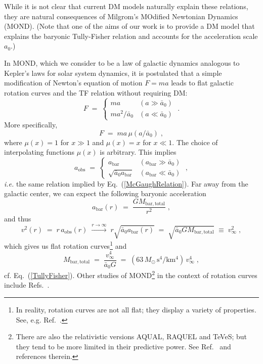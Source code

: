\documentclass{bjp}
\newcommand{\GN}{G}
\newcommand{\ac}{\bar{a}_0}
\begin{document}
While it is not clear that current DM models  naturally explain these relations, 
they are natural consequences of Milgrom's MOdified Newtonian Dynamics (MOND).\cite{Milgrom:1983ca,Milgrom:1983pn,Milgrom:1983zz} (Note that one of the aims of our work is to provide a DM model that explains the baryonic Tully-Fisher relation and accounts for the acceleration scale $a_0$.)

In MOND, which we consider to be a law of galactic dynamics analogous to Kepler's laws for solar system dynamics, it is postulated that a simple modification of Newton's equation of motion $F=ma$ leads to flat galactic rotation curves and the TF relation without requiring DM:
%
\begin{equation}
F \;=\; 
\begin{cases}
ma        & (a \gg \ac) \\
ma^2/\ac  & (a \ll \ac)
\end{cases}\;.
\end{equation}
%
More specifically,
%
\begin{equation}
F \;=\; ma\,\mu(a/\ac)\;,
\label{MOND-EQM}
\end{equation}
%
where $\mu(x) = 1$ for $x \gg 1$ and $\mu(x) = x$ for $x \ll 1$.
The choice of interpolating functions $\mu(x)$ is arbitrary.
This implies
%
\begin{equation}
a_\mathrm{obs} \;=\; 
\begin{cases}
a_\mathrm{bar} & (a_\mathrm{bar} \gg \ac) \\
\sqrt{\ac a_\mathrm{bar}} & (a_\mathrm{bar} \ll \ac)
\end{cases}\;,
\end{equation}
%
\textit{i.e.} the same relation implied by Eq.~(\ref{McGaughRelation}).
Far away from the galactic center, we can expect the following baryonic acceleration
%
\begin{equation}
a_\mathrm{bar}(r) \;=\; \dfrac{\GN M_\mathrm{bar,total}}{r^2}\;,
\end{equation}
%
and thus
%
\begin{equation}
v^2(r) \;=\; r\,a_\mathrm{obs}(r) \;\xrightarrow{r\rightarrow\infty}\; r\sqrt{\ac a_\mathrm{bar}(r)}
\;=\; \sqrt{\ac\GN M_\mathrm{bar,total}} 
\;\equiv\;v_\infty^2
\;,
\end{equation}
%
which gives us flat rotation curves\footnote{%
In reality, rotation curves are not all flat; they display a variety of 
properties. See, e.g. Ref.~.
}
and
%
\begin{equation}
M_\mathrm{bar,total} \;=\;
\dfrac{v_\infty^4}{\ac\GN}
\;=\; (63\,M_\odot\,\mathrm{s^4/km^4})\,v_\infty^4
\;,
\end{equation}
%
cf. Eq.~(\ref{TullyFisher}).
Other studies of MOND\footnote{There are also the relativistic versions
AQUAL, RAQUEL and TeVeS; but they tend to be more limited in their
predictive power.  See Ref.~ and references therein.} 
in the context of rotation curves include
Refs.~.
\end{document}

